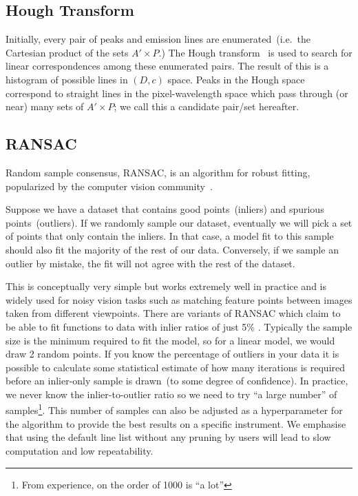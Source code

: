 \documentclass[fleqn,usenatbib]{rasti}
\begin{document}
\subsection{Hough Transform}
Initially, every pair of peaks and emission lines are enumerated~(i.e.\ the
Cartesian product of the sets $A' \times P$.) The Hough
transform~\citep{osti_4746348} is used to search for linear correspondences
among these enumerated pairs. The result of this is a histogram of possible lines
in $(D, c)$ space. Peaks in the Hough space correspond to straight lines
in the pixel-wavelength space which pass through (or near) many sets of
$A' \times P$; we call this a candidate pair/set hereafter.

\subsection{RANSAC}
Random sample consensus, RANSAC, is an algorithm for robust fitting,
popularized by the computer vision community~\citep{fischler_bolles_1981}.

Suppose we have a dataset that contains good points~(inliers) and spurious
points~(outliers). If we randomly sample our dataset, eventually we will
pick a set of points that only contain the inliers. In that case, a model
fit to this sample should also fit the majority of the rest of our data.
Conversely, if we sample an outlier by mistake, the fit will not agree with
the rest of the dataset.

This is conceptually very simple but works extremely well in practice and is widely used for noisy vision tasks such as matching feature points between images taken from different viewpoints. There are variants of RANSAC which claim to be able to fit functions to data with inlier ratios of just 5\% \citep{hast_optimal_ransac}.
Typically the sample size is the minimum required to fit the model, so for
a linear model, we would draw 2 random points. If you know the percentage of
outliers in your data it is possible to calculate some statistical estimate
of how many iterations is required before an inlier-only sample is drawn~(to
some degree of confidence). In practice, we never know the inlier-to-outlier
ratio so we need to try ``a large number'' of samples\footnote{From experience,
on the order of 1000 is ``a lot''}. This number of samples can also be adjusted as 
a hyperparameter for the algorithm to provide the best results on a specific
instrument. We emphasise that using the default line list without any
pruning by users will lead to slow computation and low repeatability.
\end{document}
